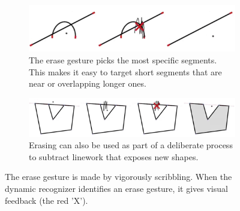 \begin{figure}
  \centering
  \begin{subfigure}[t]{0.7\textwidth}
    \includegraphics[width=\linewidth]{img/erase-basic.pdf}
    \caption{The erase gesture picks the most specific segments. This
      makes it easy to target short segments that are near or
      overlapping longer ones.}
    \label{fig:erase-basic}
  \end{subfigure}
  \vspace{5mm}

  \begin{subfigure}[t]{0.7\textwidth}
    \includegraphics[width=\linewidth]{img/erase-cutout.pdf}
    \caption{Erasing can also be used as part of a deliberate process
      to subtract linework that exposes new shapes.}
    \label{fig:erase-cutout}
  \end{subfigure}
  \caption[Erase gesture]{The erase gesture is made by vigorously
    scribbling. When the dynamic recognizer identifies an erase
    gesture, it gives visual feedback (the red 'X').}
  \label{fig:erase}
\end{figure}
